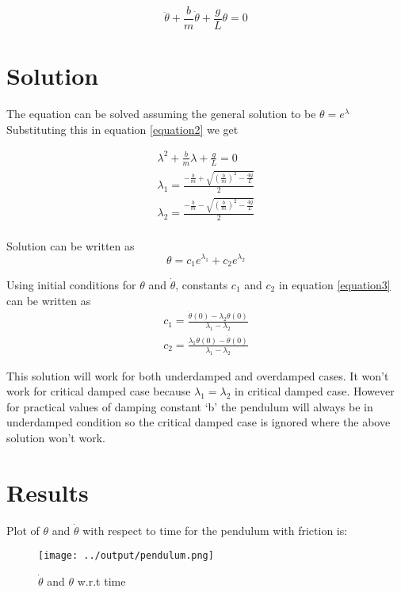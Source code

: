 \documentclass[12pt, a4paper]{report}
\begin{document}
\begin{equation}
\label{equation2}
\ddot{\theta} + \frac{b}{m}\dot{\theta} + \frac{g}{L}\theta = 0
\end{equation}

\section*{Solution}
The equation can be solved assuming the general solution to be $\theta = e^{\lambda}$
Substituting this in equation \ref{equation2} we get

\begin{eqnarray}
\lambda^2 + \frac{b}{m}\lambda + \frac{g}{L} = 0\\
\lambda_1 = \frac{-\frac{b}{m} + \sqrt{(\frac{b}{m})^2 - \frac{4g}{L}}}{2}\\
\lambda_2 = \frac{-\frac{b}{m} - \sqrt{(\frac{b}{m})^2 - \frac{4g}{L}}}{2}\\
\end{eqnarray}

\noindent
Solution can be written as 
\begin{equation}
\label{equation3}
\theta = c_1e^{\lambda_1} + c_2e^{\lambda_2}
\end{equation}

\noindent
Using initial conditions for $\theta$ and $\dot{\theta}$, constants $c_1$ and $c_2$ in equation \ref{equation3} can be written as
\begin{eqnarray}
c_1 = \frac{\dot{\theta}(0) - \lambda_2\theta(0)}{\lambda_1 - \lambda_2}\\
c_2 = \frac{\lambda_1\theta(0) - \dot{\theta}(0)}{\lambda_1 - \lambda_2}
\end{eqnarray}

\noindent
This solution will work for both underdamped and overdamped cases. It won't work for critical damped case because $\lambda_1=\lambda_2$ in critical damped case. However for practical values of damping constant `b' the pendulum will always be in underdamped condition so the critical damped case is ignored where the above solution won't work.

\section*{Results}
Plot of $\theta$ and $\dot{\theta}$ with respect to time for the pendulum with friction is:\\
\begin{figure}[H]
\label{pendulum}
\texttt{[image: ../output/pendulum.png]}
\caption{$\dot{\theta}$ and $\theta$ w.r.t time}
\end{figure}



\end{document}
